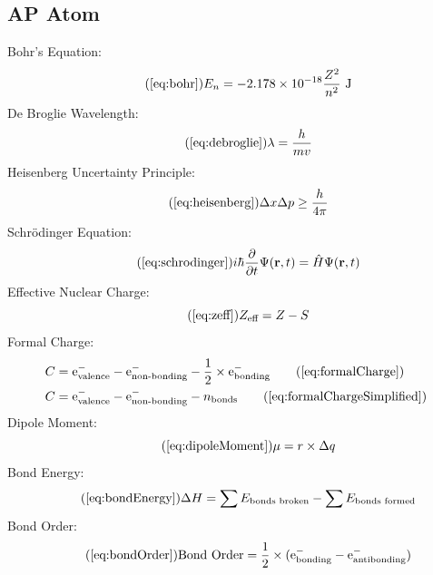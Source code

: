     \subsection{AP Atom}
        Bohr's Equation:
        \begin{equation}\tag{\ref{eq:bohr}}
            E_n = -2.178 \times 10^{-18} \frac{Z^2}{n^2} \text{ J}
        \end{equation}
        De Broglie Wavelength:
        \begin{equation}\tag{\ref{eq:debroglie}}
            \lambda = \frac{h}{mv}
        \end{equation}
        Heisenberg Uncertainty Principle:
        \begin{equation}\tag{\ref{eq:heisenberg}}
            \Delta x \Delta p \geq \frac{h}{4\pi}
        \end{equation}
        Schrödinger Equation:
        \begin{equation}\tag{\ref{eq:schrodinger}}
            i\hbar \frac{\partial}{\partial t} \Psi(\mathbf{r}, t) = \hat{H} \Psi(\mathbf{r}, t)
        \end{equation}
        Effective Nuclear Charge:
        \begin{equation}\tag{\ref{eq:zeff}}
            Z_{\text{eff}} = Z - S
        \end{equation}
        Formal Charge:
        \begin{align}
            C &= \ce{e-}_\text{valence} - \ce{e-}_\text{non-bonding} - \frac{1}{2} \times \ce{e-}_\text{bonding} \tag{\ref{eq:formalCharge}}\\
            C &= \ce{e-}_\text{valence} - \ce{e-}_\text{non-bonding} - n_\text{bonds} \tag{\ref{eq:formalChargeSimplified}}
        \end{align}
        Dipole Moment:
        \begin{equation}\tag{\ref{eq:dipoleMoment}}
            \mu = r \times \Delta q
        \end{equation}
        Bond Energy:
        \begin{equation}\tag{\ref{eq:bondEnergy}}
            \Delta H = \sum E_\text{bonds broken} - \sum E_\text{bonds formed}
        \end{equation}
        Bond Order:
        \begin{equation}\tag{\ref{eq:bondOrder}}
            \text{Bond Order} = \frac{1}{2} \times (\ce{e-}_\text{bonding} - \ce{e-}_\text{antibonding})
        \end{equation}
